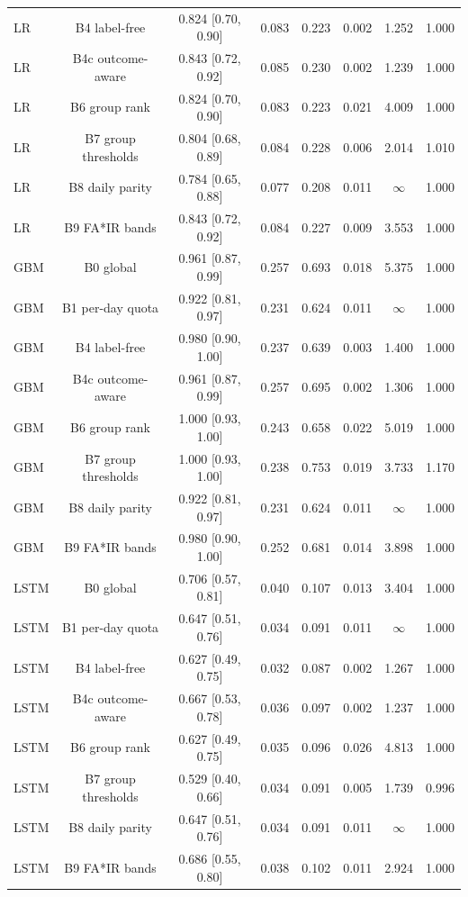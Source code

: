 \documentclass[10pt,onecolumn,letterpaper]{article}
\begin{document}
\begin{table}[!t]
{\begin{tabular}{lccccccc}
LR & B4 label-free & 0.824 [0.70, 0.90] & 0.083 & 0.223 & 0.002 & 1.252 & 1.000 \\
LR & B4c outcome-aware & 0.843 [0.72, 0.92] & 0.085 & 0.230 & 0.002 & 1.239 & 1.000 \\
LR & B6 group rank & 0.824 [0.70, 0.90] & 0.083 & 0.223 & 0.021 & 4.009 & 1.000 \\
LR & B7 group thresholds & 0.804 [0.68, 0.89] & 0.084 & 0.228 & 0.006 & 2.014 & 1.010 \\
LR & B8 daily parity & 0.784 [0.65, 0.88] & 0.077 & 0.208 & 0.011 & $\infty$ & 1.000 \\
LR & B9 FA*IR bands & 0.843 [0.72, 0.92] & 0.084 & 0.227 & 0.009 & 3.553 & 1.000 \\
GBM & B0 global & 0.961 [0.87, 0.99] & 0.257 & 0.693 & 0.018 & 5.375 & 1.000 \\
GBM & B1 per-day quota & 0.922 [0.81, 0.97] & 0.231 & 0.624 & 0.011 & $\infty$ & 1.000 \\
GBM & B4 label-free & 0.980 [0.90, 1.00] & 0.237 & 0.639 & 0.003 & 1.400 & 1.000 \\
GBM & B4c outcome-aware & 0.961 [0.87, 0.99] & 0.257 & 0.695 & 0.002 & 1.306 & 1.000 \\
GBM & B6 group rank & 1.000 [0.93, 1.00] & 0.243 & 0.658 & 0.022 & 5.019 & 1.000 \\
GBM & B7 group thresholds & 1.000 [0.93, 1.00] & 0.238 & 0.753 & 0.019 & 3.733 & 1.170 \\
GBM & B8 daily parity & 0.922 [0.81, 0.97] & 0.231 & 0.624 & 0.011 & $\infty$ & 1.000 \\
GBM & B9 FA*IR bands & 0.980 [0.90, 1.00] & 0.252 & 0.681 & 0.014 & 3.898 & 1.000 \\
LSTM & B0 global & 0.706 [0.57, 0.81] & 0.040 & 0.107 & 0.013 & 3.404 & 1.000 \\
LSTM & B1 per-day quota & 0.647 [0.51, 0.76] & 0.034 & 0.091 & 0.011 & $\infty$ & 1.000 \\
LSTM & B4 label-free & 0.627 [0.49, 0.75] & 0.032 & 0.087 & 0.002 & 1.267 & 1.000 \\
LSTM & B4c outcome-aware & 0.667 [0.53, 0.78] & 0.036 & 0.097 & 0.002 & 1.237 & 1.000 \\
LSTM & B6 group rank & 0.627 [0.49, 0.75] & 0.035 & 0.096 & 0.026 & 4.813 & 1.000 \\
LSTM & B7 group thresholds & 0.529 [0.40, 0.66] & 0.034 & 0.091 & 0.005 & 1.739 & 0.996 \\
LSTM & B8 daily parity & 0.647 [0.51, 0.76] & 0.034 & 0.091 & 0.011 & $\infty$ & 1.000 \\
LSTM & B9 FA*IR bands & 0.686 [0.55, 0.80] & 0.038 & 0.102 & 0.011 & 2.924 & 1.000 \\
\bottomrule
\end{tabular}}
\end{table}
\end{document}
